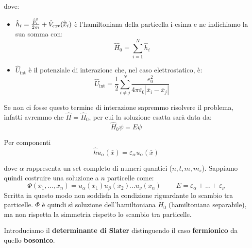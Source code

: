 \noindent dove:
\begin{itemize}
    \item $\hat h_i=\frac{{\hat{\overline{p}}}_i^2}{2m}+\hat V_{\text ext}(\hat{\overline{x}}_i)$ è l'hamiltoniana della particella i-esima e ne indichiamo la sua somma con:
    \begin{equation*}
        \hat H_0 = \sum_{i=1}^N \hat h_i
    \end{equation*}
    \item $\hat U_{\text{int}}$ è il potenziale di interazione che, nel caso elettrostatico, è: 
    \begin{equation*}
        \hat U_{\text{int}}=\frac 12 \sum_{i \neq j}^N\frac{e_0^2}{4\pi\varepsilon_0|\overline x_i - \overline x_j|}
    \end{equation*}
\end{itemize}

\noindent Se non ci fosse questo termine di interazione sapremmo risolvere il problema, infatti avremmo che $\hat H = \hat H_0$, per cui la soluzione esatta sarà data da:
\begin{equation*}
    \hat H_0\psi = E \psi 
\end{equation*}

\noindent Per componenti
\begin{equation*}
    \hat h u_\alpha(\overline x) = \varepsilon_\alpha u_\alpha(\overline x)
\end{equation*}

\noindent dove $\alpha$ rappresenta un set completo di numeri quantici ($n, l, m, m_s$). Sappiamo quindi costruire una soluzione a $n$ particelle come:
\begin{equation*}
    \Phi(\overline{x}_1, \dots, \overline{x}_n)=u_\alpha(\overline{x}_1)u_\beta(\overline{x}_2)\dots u_\nu(\overline{x}_n)
    \ \ \ \ \ \ \ \ \ \
    E = \varepsilon_\alpha + \dots + \varepsilon_\nu
\end{equation*}
\noindent Scritta in questo modo non soddisfa la condizione riguardante lo scambio tra particelle. $\Phi$ è quindi sì soluzione dell'hamiltoniana $H_0$ (hamiltoniana separabile), ma non rispetta la simmetria rispetto lo scambio tra particelle.

\noindent Introduciamo il \textbf{determinante di Slater} distinguendo il caso \textbf{fermionico} da quello \textbf{bosonico}.

